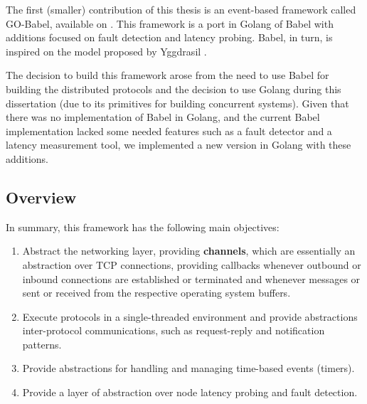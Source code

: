 
The first (smaller) contribution of this thesis is an event-based framework called GO-Babel, available on \cite{goBabel}. This framework is a port in Golang \cite{golang} of Babel \cite{babel} with additions focused on fault detection and latency probing. Babel, in turn, is inspired on the model proposed by Yggdrasil \cite{akosThesis}.

The decision to build this framework arose from the need to use Babel for building the distributed protocols and the decision to use Golang during this dissertation (due to its primitives for building concurrent systems). Given that there was no implementation of Babel in Golang, and the current Babel implementation lacked some needed features such as a fault detector and a latency measurement tool, we implemented a new version in Golang with these additions.

\subsection{Overview}

In summary, this framework has the following main objectives:

\begin{enumerate}

    \item Abstract the networking layer, providing \textbf{channels}, which are essentially an abstraction over TCP connections, providing callbacks whenever outbound or inbound connections are established or terminated and whenever messages or sent or received from the respective operating system buffers.

    \item Execute protocols in a single-threaded environment and provide abstractions inter-protocol communications, such as request-reply and notification patterns.
    
    \item Provide abstractions for handling and managing time-based events (timers).

    \item Provide a layer of abstraction over node latency probing and fault detection.

\end{enumerate}

